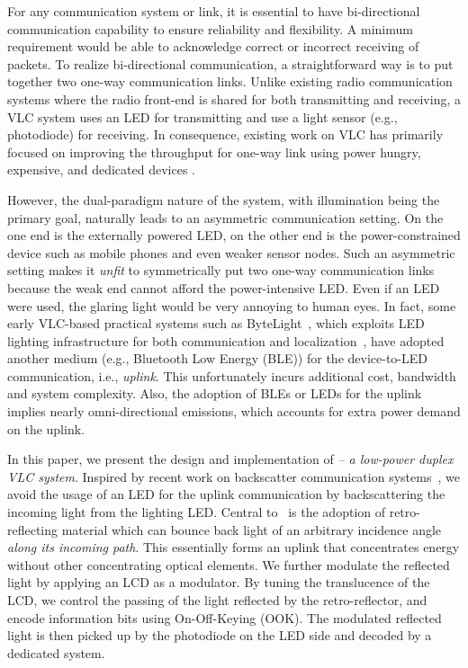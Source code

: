 For any communication system or link, it is essential to have bi-directional communication capability to ensure reliability and flexibility. A minimum requirement would be able to acknowledge correct or incorrect receiving of packets. To realize bi-directional communication, a straightforward way is to put together two one-way communication links. Unlike existing radio communication systems where the radio front-end is shared for both transmitting and receiving, a VLC system uses an LED for transmitting and use a light sensor (e.g., photodiode) for receiving. In consequence, existing work on VLC has primarily focused on improving the throughput for one-way link using power hungry, expensive, and dedicated devices \cite{expensive,expensive2,retro1,retro2}.  

However, the dual-paradigm nature of the system, with illumination being the primary goal, naturally leads to an asymmetric communication setting. On the one end is the externally powered LED, on the other end is the power-constrained device such as mobile phones and even weaker sensor nodes. Such an asymmetric setting makes it \textit{unfit} to symmetrically put two one-way communication links because the weak end cannot afford the power-intensive LED. Even if an LED were used, the glaring light would be very annoying to human eyes. In fact, some early VLC-based practical systems such as ByteLight~\cite{ble0}, which exploits LED lighting infrastructure for both communication and localization~\cite{location1,location2}, have adopted another medium (e.g., Bluetooth Low Energy (BLE)) for the device-to-LED communication, i.e., \textit{uplink}. This unfortunately incurs additional cost, bandwidth and system complexity. Also, the adoption of BLEs or LEDs for the uplink implies nearly omni-directional emissions, which accounts for extra power demand on the uplink. 

In this paper, we present the design and implementation of \textit{\retro -- a low-power duplex VLC system}. Inspired by recent work on backscatter communication systems~\cite{abc1,abc4}, we avoid the usage of an LED for the uplink communication by backscattering the incoming light from the lighting LED. Central to \retro\ is the adoption of retro-reflecting material which can bounce back light of an arbitrary incidence angle \textit{along its incoming path}. This essentially forms an uplink that concentrates energy without other concentrating optical elements. We further modulate the reflected light by applying an LCD as a modulator. By tuning the translucence of the LCD, we control the passing of the light reflected by the retro-reflector, and encode information bits using On-Off-Keying (OOK). The modulated reflected light is then picked up by the photodiode on the LED side and decoded by a dedicated system.


